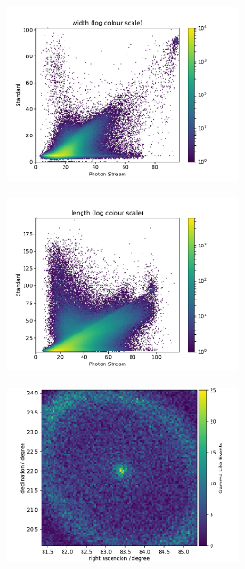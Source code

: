 \begin{frame}[t]
    \begin{figure}
        \centering
        \includegraphics[width=0.6\textwidth]{fig/width_compare.pdf}
    \end{figure}
\end{frame}

\begin{frame}[t]
    \begin{figure}
        \centering
        \includegraphics[width=0.6\textwidth]{fig/length_compare.pdf}
    \end{figure}
\end{frame}

\begin{frame}[t]
    \begin{figure}
        \centering
        \includegraphics[width=0.6\textwidth]{fig/skymap_data.pdf}
    \end{figure}
\end{frame}



